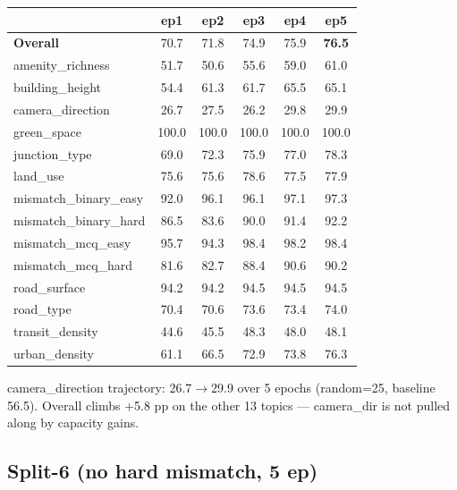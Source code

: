 \documentclass[11pt]{article}
\begin{document}
\begin{table}[h]\centering\scriptsize
\setlength{\tabcolsep}{6pt}
\begin{tabular}{l c c c c c}
\toprule
& ep1 & ep2 & ep3 & ep4 & ep5 \\
\midrule
\textbf{Overall}      & 70.7 & 71.8 & 74.9 & 75.9 & \textbf{76.5} \\
amenity\_richness     & 51.7 & 50.6 & 55.6 & 59.0 & 61.0 \\
building\_height      & 54.4 & 61.3 & 61.7 & 65.5 & 65.1 \\
camera\_direction     & 26.7 & 27.5 & 26.2 & 29.8 & 29.9 \\
green\_space          & 100.0 & 100.0 & 100.0 & 100.0 & 100.0 \\
junction\_type        & 69.0 & 72.3 & 75.9 & 77.0 & 78.3 \\
land\_use             & 75.6 & 75.6 & 78.6 & 77.5 & 77.9 \\
mismatch\_binary\_easy& 92.0 & 96.1 & 96.1 & 97.1 & 97.3 \\
mismatch\_binary\_hard& 86.5 & 83.6 & 90.0 & 91.4 & 92.2 \\
mismatch\_mcq\_easy   & 95.7 & 94.3 & 98.4 & 98.2 & 98.4 \\
mismatch\_mcq\_hard   & 81.6 & 82.7 & 88.4 & 90.6 & 90.2 \\
road\_surface         & 94.2 & 94.2 & 94.5 & 94.5 & 94.5 \\
road\_type            & 70.4 & 70.6 & 73.6 & 73.4 & 74.0 \\
transit\_density      & 44.6 & 45.5 & 48.3 & 48.0 & 48.1 \\
urban\_density        & 61.1 & 66.5 & 72.9 & 73.8 & 76.3 \\
\bottomrule
\end{tabular}
\end{table}

camera\_direction trajectory: 26.7$\to$29.9 over 5 epochs (random=25, baseline 56.5). Overall climbs +5.8 pp on the other 13 topics --- camera\_dir is not pulled along by capacity gains.

\newpage
\subsection*{Split-6 (no hard mismatch, 5 ep)}
\end{document}

